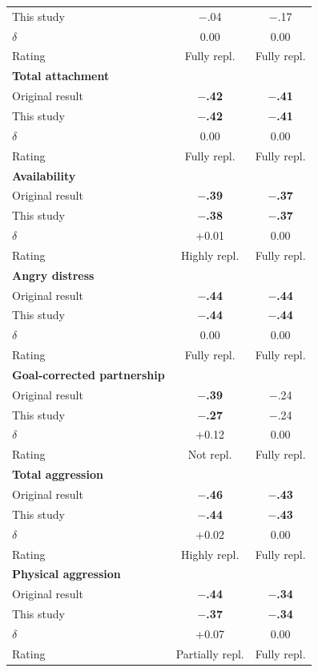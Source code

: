 \documentclass[
  english,
  man,floatsintext]{apa6}
\begin{document}
\begin{center}
\begin{ThreePartTable}
{\begin{longtable}{lcc}
This study & $-$.04 & $-$.17\\
$\delta$ & 0.00 & 0.00\\
Rating & Fully repl. & Fully repl.\\
\textbf{Total attachment} &  & \\
Original result & \textbf{$-$.42} & \textbf{$-$.41}\\
This study & \textbf{$-$.42} & \textbf{$-$.41}\\
$\delta$ & 0.00 & 0.00\\
Rating & Fully repl. & Fully repl.\\
\textbf{Availability} &  & \\
Original result & \textbf{$-$.39} & \textbf{$-$.37}\\
This study & \textbf{$-$.38} & \textbf{$-$.37}\\
$\delta$ & +0.01 & 0.00\\
Rating & Highly repl. & Fully repl.\\
\textbf{Angry distress} &  & \\
Original result & \textbf{$-$.44} & \textbf{$-$.44}\\
This study & \textbf{$-$.44} & \textbf{$-$.44}\\
$\delta$ & 0.00 & 0.00\\
Rating & Fully repl. & Fully repl.\\
\textbf{Goal-corrected partnership} &  & \\
Original result & \textbf{$-$.39} & $-$.24\\
This study & \textbf{$-$.27} & $-$.24\\
$\delta$ & +0.12 & 0.00\\
Rating & Not repl. & Fully repl.\\
\textbf{Total aggression} &  & \\
Original result & \textbf{$-$.46} & \textbf{$-$.43}\\
This study & \textbf{$-$.44} & \textbf{$-$.43}\\
$\delta$ & +0.02 & 0.00\\
Rating & Highly repl. & Fully repl.\\
\textbf{Physical aggression} &  & \\
Original result & \textbf{$-$.44} & \textbf{$-$.34}\\
This study & \textbf{$-$.37} & \textbf{$-$.34}\\
$\delta$ & +0.07 & 0.00\\
Rating & Partially repl. & Fully repl.\\

\end{longtable}}
\end{ThreePartTable}
\end{center}
\end{document}
